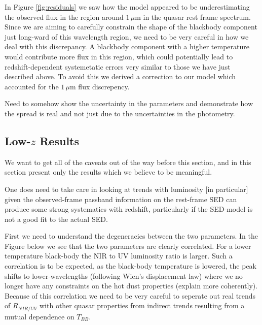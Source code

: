 In Figure \ref{fig:residuals} we saw how the model appeared to be underestimating the observed flux in the region around $1\,\mu$m in the quasar rest frame spectrum. Since we are aiming to carefully constrain the shape of the blackbody component just long-ward of this wavelength region, we need to be very careful in how we deal with this discrepancy. A blackbody component with a higher temperature would contribute more flux in this region, which could potentially lead to redshift-dependent systemetatic errors very similar to those we have just described above. To avoid this we derived a correction to our model which accounted for the $1\,\mu$m flux discrepency. 



Need to somehow show the uncertainty in the parameters and demonstrate how the spread is real and not just due to the uncertainties in the photometry.



\subsection{Low-$z$ Results}

We want to get all of the caveats out of the way before this section, and in this section present only the results which we believe to be meaningful.

One does need to take care in looking at trends with luminosity [in particular] given the observed-frame passband information on the rest-frame SED can produce some strong systematics with redshift, particularly if the SED-model is not a good fit to the actual SED. 

First we need to understand the degeneracies between the two parameters. 
In the Figure below we see that the two parameters are clearly correlated. 
For a lower temperature black-body the NIR to UV luminosity ratio is larger. 
Such a correlation is to be expected, as the black-body temperature is lowered, the peak shifts to lower-wavelengths (following Wien's displacement law) where we no longer have any constraints on the hot dust properties (explain more coherently). 
Because of this correlation we need to be very careful to seperate out real trends of $R_{NIR/UV}$ with other quasar properties from indirect trends resulting from a mutual dependence on $T_{BB}$.  




